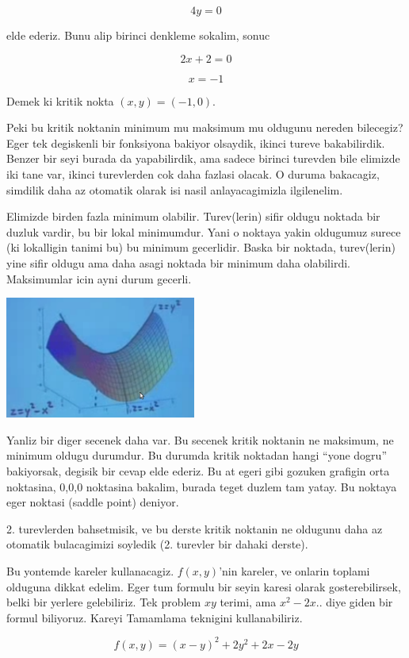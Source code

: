 \documentclass[12pt,fleqn]{article}
\begin{document}
\[ 4y = 0 \]

elde ederiz. Bunu alip birinci denkleme sokalim, sonuc

\[ 2x + 2 = 0 \]

\[ x = -1 \]

Demek ki kritik nokta $(x,y) = (-1,0)$. 

Peki bu kritik noktanin minimum mu maksimum mu oldugunu nereden bilecegiz?
Eger tek degiskenli bir fonksiyona bakiyor olsaydik, ikinci tureve
bakabilirdik. Benzer bir seyi burada da yapabilirdik, ama sadece birinci
turevden bile elimizde iki tane var, ikinci turevlerden cok daha fazlasi
olacak. O duruma bakacagiz, simdilik daha az otomatik olarak isi nasil
anlayacagimizla ilgilenelim. 

Elimizde birden fazla minimum olabilir. Turev(lerin) sifir oldugu noktada
bir duzluk vardir, bu bir lokal minimumdur. Yani o noktaya yakin oldugumuz
surece (ki lokalligin tanimi bu) bu minimum gecerlidir. Baska bir noktada,
turev(lerin) yine sifir oldugu ama daha asagi noktada bir minimum daha
olabilirdi. Maksimumlar icin ayni durum gecerli.

\includegraphics[height=4cm]{9_4.png}

Yanliz bir diger secenek daha var. Bu secenek kritik noktanin ne maksimum,
ne minimum oldugu durumdur. Bu durumda kritik noktadan hangi ``yone dogru''
bakiyorsak, degisik bir cevap elde ederiz. Bu at egeri gibi gozuken
grafigin orta noktasina, 0,0,0 noktasina bakalim, burada teget duzlem tam
yatay. Bu noktaya eger noktasi (saddle point) deniyor. 

2. turevlerden bahsetmisik, ve bu derste kritik noktanin ne oldugunu daha
az otomatik bulacagimizi soyledik (2. turevler bir dahaki derste). 

Bu yontemde kareler kullanacagiz. $f(x,y)$'nin kareler, ve onlarin toplami
olduguna dikkat edelim. Eger tum formulu bir seyin karesi olarak
gosterebilirsek, belki bir yerlere gelebiliriz. Tek problem $xy$ terimi,
ama $x^2 - 2x..$ diye giden bir formul biliyoruz. Kareyi Tamamlama
teknigini kullanabiliriz. 

\[ f(x,y) = (x-y)^2 + 2y^2 + 2x - 2y \]
\end{document}
